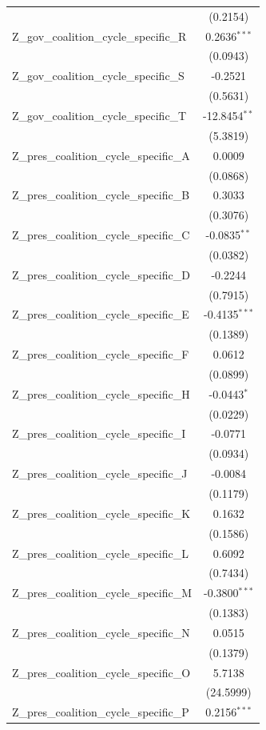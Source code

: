 \begin{tabular}{lc}
 & (0.2154) \\
Z\_gov\_coalition\_cycle\_specific\_R & 0.2636$^{***}$ \\
 & (0.0943) \\
Z\_gov\_coalition\_cycle\_specific\_S & -0.2521 \\
 & (0.5631) \\
Z\_gov\_coalition\_cycle\_specific\_T & -12.8454$^{**}$ \\
 & (5.3819) \\
Z\_pres\_coalition\_cycle\_specific\_A & 0.0009 \\
 & (0.0868) \\
Z\_pres\_coalition\_cycle\_specific\_B & 0.3033 \\
 & (0.3076) \\
Z\_pres\_coalition\_cycle\_specific\_C & -0.0835$^{**}$ \\
 & (0.0382) \\
Z\_pres\_coalition\_cycle\_specific\_D & -0.2244 \\
 & (0.7915) \\
Z\_pres\_coalition\_cycle\_specific\_E & -0.4135$^{***}$ \\
 & (0.1389) \\
Z\_pres\_coalition\_cycle\_specific\_F & 0.0612 \\
 & (0.0899) \\
Z\_pres\_coalition\_cycle\_specific\_H & -0.0443$^{*}$ \\
 & (0.0229) \\
Z\_pres\_coalition\_cycle\_specific\_I & -0.0771 \\
 & (0.0934) \\
Z\_pres\_coalition\_cycle\_specific\_J & -0.0084 \\
 & (0.1179) \\
Z\_pres\_coalition\_cycle\_specific\_K & 0.1632 \\
 & (0.1586) \\
Z\_pres\_coalition\_cycle\_specific\_L & 0.6092 \\
 & (0.7434) \\
Z\_pres\_coalition\_cycle\_specific\_M & -0.3800$^{***}$ \\
 & (0.1383) \\
Z\_pres\_coalition\_cycle\_specific\_N & 0.0515 \\
 & (0.1379) \\
Z\_pres\_coalition\_cycle\_specific\_O & 5.7138 \\
 & (24.5999) \\
Z\_pres\_coalition\_cycle\_specific\_P & 0.2156$^{***}$ \\

\end{tabular}
